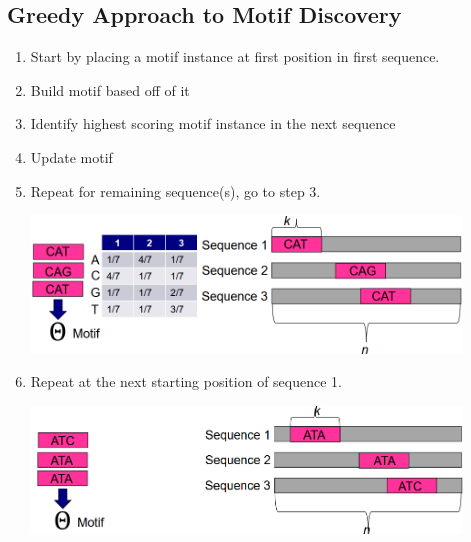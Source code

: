 \documentclass[10pt]{article}
\begin{document}
\subsection*{Greedy Approach to Motif Discovery}
\begin{enumerate}
	\item Start by placing a motif instance at first position in first sequence.
	\item Build motif based off of it
	\item Identify highest scoring motif instance in the next sequence
	\item Update motif
	\item Repeat for remaining sequence(s), go to step 3.
	\begin{center} 
        \includegraphics*[width=0.9\textwidth]{W7_20.png} 
    \end{center}
    \item Repeat at the next starting position of sequence 1.
    \begin{center} 
        \includegraphics*[width=0.9\textwidth]{W7_21.png} 
    \end{center}
\end{enumerate}
\end{document}
